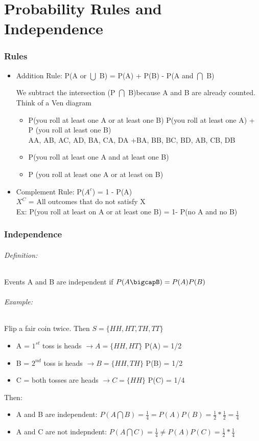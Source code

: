 \documentclass[11pt]{article}
\begin{document}
    \part[Probability Rules and Independence]{Probability Rules and Independence}
    \section[Rules]{Rules}
    \begin{itemize}
        \item Addition Rule: P(A or $\bigcup$ B) = P(A) + P(B) - P(A and $\bigcap$ B)

        We subtract the intersection (P $\bigcap$ B)because A and B are already counted.
        Think of a Ven diagram
        \begin{itemize}
            \item P(you roll at least one A or at least one B)
            \subitem P(you roll at least one A) + P (you roll at least one B)
            \\ AA, AB, AC, AD, BA, CA, DA +BA, BB, BC, BD, AB, CB, DB
            \item P(you roll at least one A and at least one B)
            \item P (you roll at least one A or at least on B)
        \end{itemize}
        \item Complement Rule: P($A^c$) = 1 - P(A) \\
        $X^C$ = All outcomes that do not satisfy X
        \\
        Ex: P(you roll at least on A or at least one B) = 1- P(no A and no B)
    \end{itemize}
    \section[Independence]{Independence}
    \paragraph[Definition]{Definition: } Events A and B are independent if
    $P(A\bigcapB) = P(A)P(B)$
    \paragraph[Example]{Example: }Flip a fair coin twice. Then
    $S = \{HH, HT, TH, TT\}$
    \begin{itemize}
        \item A = $1^{st}$ toss is heads $\to A= \{HH, HT\}$ P(A) = 1/2
        \item B = $2^{nd}$ toss is heads $\to B= \{HH, TH\}$ P(B) = 1/2
        \item C = both tosses are heads $\to C= \{HH\}$ P(C) = 1/4
    \end{itemize}
    Then:
    \begin{itemize}
        \item A and B are independent:
        $P(A\bigcap B) = \frac{1}{4} = P(A)P(B) = \frac{1}{2}* \frac{1}{2} = \frac{1}{4}$
        \item A and C are not indepndent:
        $P(A\bigcap C) = \frac{1}{4} \neq P(A)P(C) = \frac{1}{2} * \frac{1}{4}$
    \end{itemize}
\end{document}
